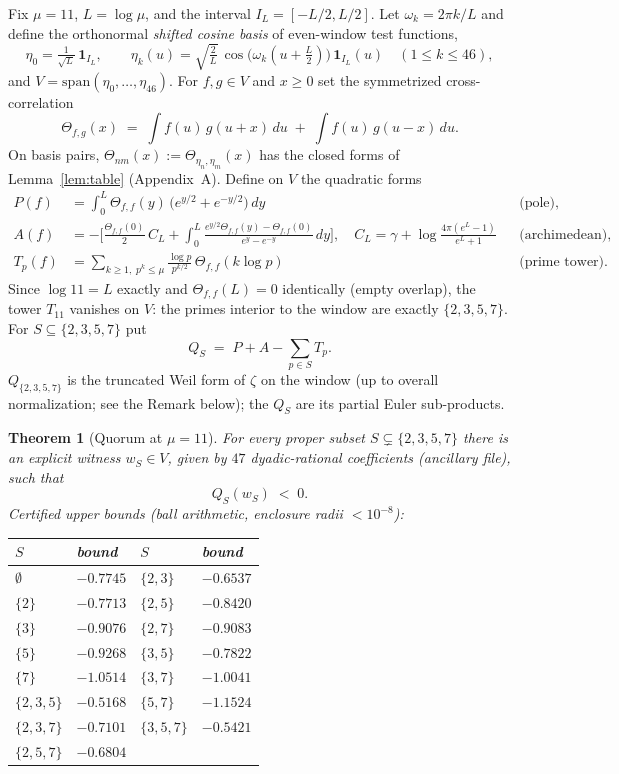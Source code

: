 \documentclass[10pt]{article}
\newtheorem{theorem}{Theorem}
\begin{document}
Fix $\mu=11$, $L=\log\mu$, and the interval $I_L=[-L/2,L/2]$. Let
$\omega_k=2\pi k/L$ and define the orthonormal \emph{shifted cosine basis}
of even-window test functions,
\[
\eta_0=\tfrac1{\sqrt L}\,\mathbf 1_{I_L},\qquad
\eta_k(u)=\sqrt{\tfrac2L}\,\cos\!\big(\omega_k(u+\tfrac L2)\big)\,
\mathbf 1_{I_L}(u)\quad(1\le k\le 46),
\]
and $V=\mathrm{span}(\eta_0,\dots,\eta_{46})$. For $f,g\in V$ and $x\ge0$
set the symmetrized cross-correlation
\[
\Theta_{f,g}(x)\;=\;\int f(u)\,g(u+x)\,du\;+\;\int f(u)\,g(u-x)\,du .
\]
On basis pairs, $\Theta_{nm}(x):=\Theta_{\eta_n,\eta_m}(x)$ has the closed
forms of Lemma~\ref{lem:table} (Appendix~A). Define on $V$ the quadratic
forms
\begin{align*}
P(f)&=\int_0^L \Theta_{f,f}(y)\,\big(e^{y/2}+e^{-y/2}\big)\,dy
&&\text{(pole)},\\
A(f)&=-\Big[\tfrac{\Theta_{f,f}(0)}2\,C_L
+\int_0^L\frac{e^{y/2}\Theta_{f,f}(y)-\Theta_{f,f}(0)}{e^{y}-e^{-y}}\,dy
\Big],
\quad C_L=\gamma+\log\!\frac{4\pi(e^L-1)}{e^L+1}
&&\text{(archimedean)},\\
T_p(f)&=\sum_{k\ge1,\;p^k\le\mu}\frac{\log p}{p^{k/2}}\,
\Theta_{f,f}(k\log p)
&&\text{(prime tower)}.
\end{align*}
Since $\log 11=L$ exactly and $\Theta_{f,f}(L)=0$ identically (empty
overlap), the tower $T_{11}$ vanishes on $V$: the primes interior to the
window are exactly $\{2,3,5,7\}$. For $S\subseteq\{2,3,5,7\}$ put
\[
Q_S \;=\; P + A - \sum_{p\in S} T_p .
\]
$Q_{\{2,3,5,7\}}$ is the truncated Weil form of $\zeta$ on the window (up
to overall normalization; see the Remark below); the $Q_S$ are its partial
Euler sub-products.

\begin{theorem}[Quorum at $\mu=11$]\label{thm}
For every proper subset $S\subsetneq\{2,3,5,7\}$ there is an explicit
witness $w_S\in V$, given by $47$ dyadic-rational coefficients (ancillary
file), such that
\[
Q_S(w_S)\;<\;0 .
\]
Certified upper bounds (ball arithmetic, enclosure radii $<10^{-8}$):
\begin{center}\small
\begin{tabular}{llll}
\toprule
$S$ & bound & $S$ & bound\\
\midrule
$\emptyset$ & $-0.7745$ & $\{2,3\}$ & $-0.6537$\\
$\{2\}$ & $-0.7713$ & $\{2,5\}$ & $-0.8420$\\
$\{3\}$ & $-0.9076$ & $\{2,7\}$ & $-0.9083$\\
$\{5\}$ & $-0.9268$ & $\{3,5\}$ & $-0.7822$\\
$\{7\}$ & $-1.0514$ & $\{3,7\}$ & $-1.0041$\\
$\{2,3,5\}$ & $-0.5168$ & $\{5,7\}$ & $-1.1524$\\
$\{2,3,7\}$ & $-0.7101$ & $\{3,5,7\}$ & $-0.5421$\\
$\{2,5,7\}$ & $-0.6804$ & &\\
\bottomrule
\end{tabular}
\end{center}
\end{theorem}
\end{document}
